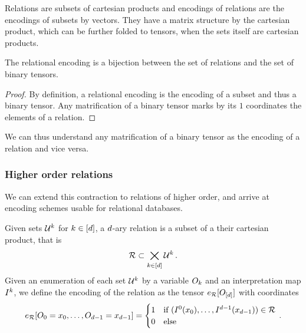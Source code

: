 Relations are subsets of cartesian products and encodings of relations are the encodings of subsets by vectors.
They have a matrix structure by the cartesian product, which can be further folded to tensors, when the sets itself are cartesian products.


\begin{theorem}
	The relational encoding is a bijection between the set of relations and the set of binary tensors.
\end{theorem}
\begin{proof}
	By definition, a relational encoding is the encoding of a subset and thus a binary tensor.
	Any matrification of a binary tensor marks by its $1$ coordinates the elements of a relation.
\end{proof}

We can thus understand any matrification of a binary tensor as the encoding of a relation and vice versa.



\subsubsection{Higher order relations}


We can extend this contraction to relations of higher order, and arrive at encoding schemes usable for relational databases.

\begin{definition}\label{def:daryRelation}
	Given sets $\mathcal{U}^{k}$ for $k\in[d]$, a $d$-ary relation is a subset of a their cartesian product, that is
		\[ \mathcal{R} \subset  \bigtimes_{k\in[d]} \mathcal{U}^{k} \, . \]
	Given an enumeration of each set $\mathcal{U}^{k}$ by a variable $O_{k}$ and an interpretation map $I^{k}$, we define the encoding of the relation as the tensor $e_{\mathcal{R}}[O_{[d]}]$ with coordinates
	\begin{align}
		e_{\mathcal{R}}[O_{0}=x_{0},\ldots,O_{d-1}=x_{d-1}]
		= \begin{cases}
		1 & \text{if } (I^{0}(x_{0}),\ldots,I^{d-1}(x_{d-1})) \in \mathcal{R} \\
		0 & \text{else}
		\end{cases} \, . 
	\end{align}
\end{definition}


